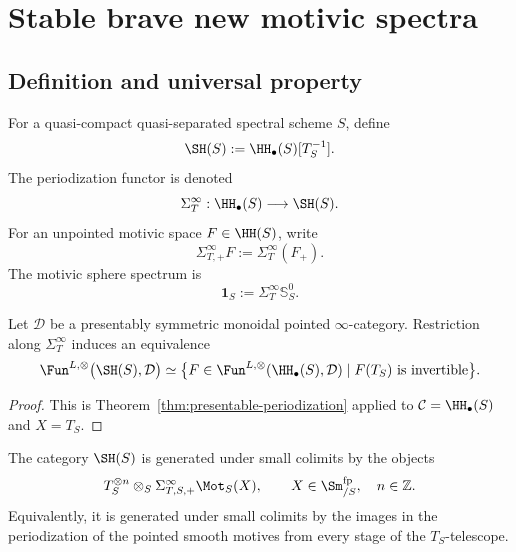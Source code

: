 \section{Stable brave new motivic spectra}
\label{sec:definition-SH}

\subsection{Definition and universal property}

\begin{definition}
\label{def:SH}
For a quasi-compact quasi-separated spectral scheme $S$, define
\[
    \SH(S)
    :=
    \HH_\bullet(S)[T_S^{-1}].
\]
The periodization functor is denoted
\[
    \Sigma_T^\infty:
    \HH_\bullet(S)
    \longrightarrow
    \SH(S).
\]
For an unpointed motivic space $F\in\HH(S)$, write
\[
    \Sigma_{T,+}^\infty F
    :=
    \Sigma_T^\infty(F_+).
\]
The motivic sphere spectrum is
\[
    \mathbf 1_S
    :=
    \Sigma_T^\infty\mathbb S^0_S.
\]
\end{definition}

\begin{proposition}
\label{prop:SH-universal-property}
Let $\mathcal D$ be a presentably symmetric monoidal pointed $\infty$-category.  Restriction along
$\Sigma_T^\infty$ induces an equivalence
\[
\begin{aligned}
    \Fun^{L,\otimes}\bigl(\SH(S),\mathcal D\bigr)
    \simeq
    \bigl\{F\in\Fun^{L,\otimes}(\HH_\bullet(S),\mathcal D)
      \mid F(T_S)\text{ is invertible}\bigr\}.
\end{aligned}
\]
\end{proposition}

\begin{proof}
This is Theorem~\ref{thm:presentable-periodization} applied to
$\mathcal C=\HH_\bullet(S)$ and $X=T_S$.
\end{proof}

\begin{lemma}
\label{lem:periodized-generators}
The category \(\SH(S)\) is generated under small colimits by the objects
\[
    T_S^{\otimes n}
    \otimes_S
    \Sigma_{T,S,+}^\infty\Mot_S(X),
    \qquad
    X\in\Sm^{\mathrm{fp}}_{/S},
    \quad
    n\in\mathbb Z.
\]
Equivalently, it is generated under small colimits by the images in the
periodization of the pointed smooth motives from every stage of the
\(T_S\)-telescope.
\end{lemma}

